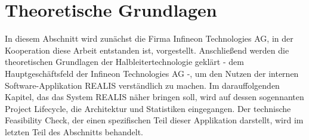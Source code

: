 \chapter{Theoretische Grundlagen}\label{Chap:TheoretischeGrundlagen}
In diesem Abschnitt wird zunächst die Firma Infineon Technologies AG, in der Kooperation diese Arbeit entstanden ist, vorgestellt. Anschließend werden die theoretischen Grundlagen der Halbleitertechnologie geklärt - dem Hauptgeschäftsfeld der Infineon Technologies AG -, um den Nutzen der internen Software-Applikation \gls{REALIS} verständlich zu machen. Im darauffolgenden Kapitel, das das System \gls{REALIS} näher bringen soll, wird auf dessen sogennanten Project Lifecycle, die Architektur und Statistiken eingegangen. Der technische Feasibility Check, der einen spezifischen Teil dieser Applikation darstellt, wird im letzten Teil des Abschnitts behandelt.




